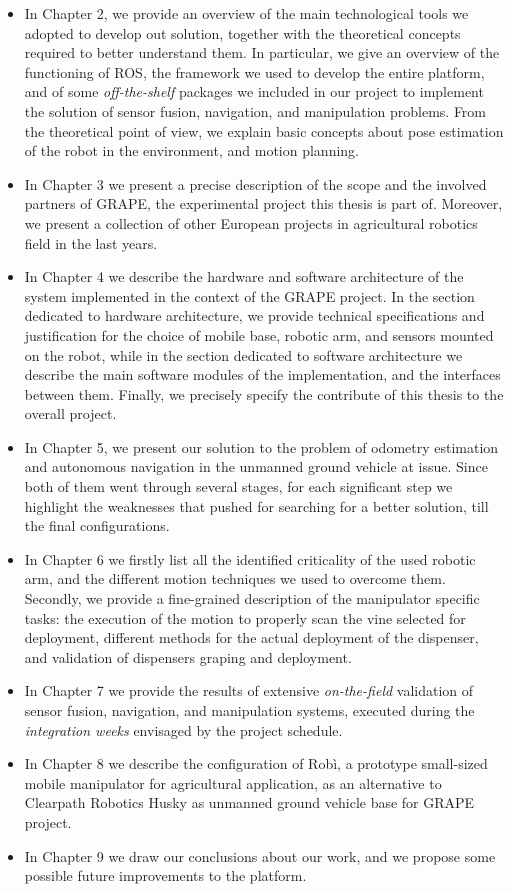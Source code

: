 \begin{itemize}
	\item In Chapter 2, we provide an overview of the main technological tools we adopted to develop out solution, together with the theoretical concepts required to better understand them. In particular, we give an overview of the functioning of \ac{ROS}, the framework we used to develop the entire platform, and of some \textit{off-the-shelf} packages we included in our project to implement the solution of sensor fusion, navigation, and manipulation problems. From the theoretical point of view, we explain basic concepts about pose estimation of the robot in the environment, and motion planning.
	\item In Chapter 3 we present a precise description of the scope and the involved partners of \ac{GRAPE}, the experimental project this thesis is part of. Moreover, we present a collection of other European projects in agricultural robotics field in the last years.
	\item In Chapter 4 we describe the hardware and software architecture of the system implemented in the context of the \ac{GRAPE} project. In the section dedicated to hardware architecture, we provide technical specifications and justification for the choice of mobile base, robotic arm, and sensors mounted on the robot, while in the section dedicated to software architecture we describe the main software modules of the implementation, and the interfaces between them. Finally, we precisely specify the contribute of this thesis to the overall project.
	\item In Chapter 5, we present our solution to the problem of odometry estimation and autonomous navigation in the unmanned ground vehicle at issue. Since both of them went through several stages, for each significant step we highlight the weaknesses that pushed for searching for a better solution, till the final configurations.
	\item In Chapter 6 we firstly list all the identified criticality of the used robotic arm, and the different motion techniques we used to overcome them. Secondly, we provide a fine-grained description of the manipulator specific tasks: the execution of the motion to properly scan the vine selected for deployment, different methods for the actual deployment of the dispenser, and validation of dispensers graping and deployment.
	\item In Chapter 7 we provide the results of extensive \textit{on-the-field} validation of sensor fusion, navigation, and manipulation systems, executed during the \textit{integration weeks} envisaged by the project schedule.
	\item In Chapter 8 we describe the configuration of Robì, a prototype small-sized mobile manipulator for agricultural application, as an alternative to Clearpath Robotics Husky as unmanned ground vehicle base for \ac{GRAPE} project.
	\item In Chapter 9 we draw our conclusions about our work, and we propose some possible future improvements to the platform.

\end{itemize}











